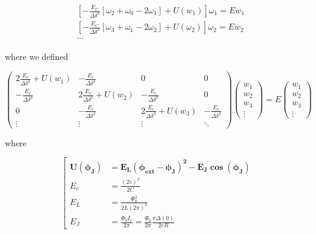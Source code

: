 \begin{equation}
  \begin{aligned}
    & \left[-\frac{E_C}{\Delta\delta^2}\left[\omega_{2}+\omega_{0}-2\omega_{1}\right] + U(w_1)\right]\omega_1 = Ew_1\\
    & \left[-\frac{E_C}{\Delta\delta^2}\left[\omega_{3}+\omega_{1}-2\omega_{2}\right] + U(\omega_2)\right]\omega_2 = Ew_2\\
    & \cdots
  \end{aligned}
\end{equation}

\noindent where we defined

\begin{framed}\noindent

  \begin{equation}\label{key}
    \begin{pmatrix}
      2\frac{E_c}{\Delta\delta^2} + U(w_1) & -\frac{E_c}{\Delta\delta^2} & 0 & 0 \\
      -\frac{E_c}{\Delta\delta^2} & 2\frac{E_c}{\Delta\delta^2} + U(w_2) &   -\frac{E_c}{\Delta\delta^2} & 0\\
      0 & -\frac{E_c}{\Delta\delta^2} & 2\frac{E_c}{\Delta\delta^2} + U(w_3) &   -\frac{E_c}{\Delta\delta^2}\\
      \vdots & \vdots & \vdots & \ddots
    \end{pmatrix}
    \begin{pmatrix}
      w_1\\w_2\\w_3\\\vdots
    \end{pmatrix}
    = E \begin{pmatrix}
      w_1\\w_2\\w_3\\\vdots
    \end{pmatrix}
  \end{equation}

  \noindent where

   \begin{equation}\label{key}
     \left[
       \begin{aligned}
         \mathbf{U(\phi_J)} & = \mathbf{E_L(\phi_\text{ext} - \phi_J)^2 - E_J\cos(\phi_J)}\\
         E_c & = \frac{(2e)^2}{2C}\\
         E_L & = \frac{\Phi_0^2}{2L(2\pi)^2}\\
         E_J & = \frac{\Phi_0I_c}{2\pi} = \frac{\Phi_0}{2\pi}\frac{\pi\Delta(0)}{2eR}
       \end{aligned}
     \right.
   \end{equation}
 \end{framed}


